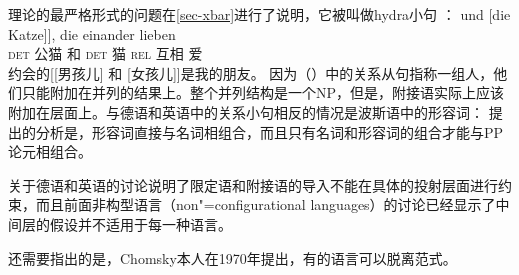 \xbarc 理论的最严格形式的问题在\ref{sec-xbar}进行了说明，它被叫做hydra小句 \citep{PR70a,Link84a-u,Kiss2005a}：
\eal
\ex {}
\gll [[der Kater] und [die Katze]], die einander lieben\\
     \spacebr{}\spacebr{}\textsc{det} 公猫 和 \textsc{det} 猫 \textsc{rel} 互相 爱\\
\ex {}约会的[[男孩儿] 和 [女孩儿]]是我的朋友。 
\zl
因为（）中的关系从句指称一组人，他们只能附加在并列的结果上。整个并列结构是一个NP，但是，附接语实际上应该附加在\xbarc 层面上。与德语和英语中的关系小句相反的情况是波斯语中的形容词： \citet{Samvelian2007a}提出的分析是，形容词直接与名词相组合，而且只有名词和形容词的组合才能与PP论元相组合。

关于德语和英语的讨论说明了限定语和附接语的导入不能在具体的投射层面进行约束，而且前面非构型语言（non"=configurational languages）的讨论已经显示了中间层的假设并不适用于每一种语言。

还需要指出的是，Chomsky本人在1970年提出，有的语言可以脱离\xbarc 范式\citeyearpar[]{Chomsky70a}。

